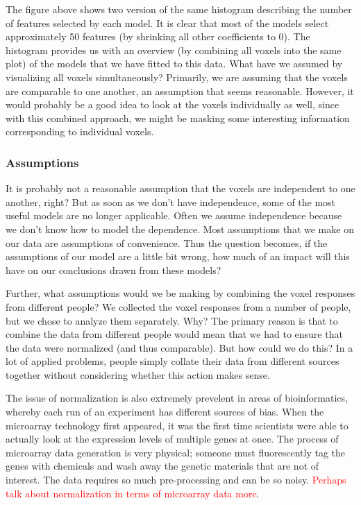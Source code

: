 The figure above shows two version of the same histogram describing the number of features selected by each model. It is clear that most of the models select approximately 50 features (by shrinking all other coefficients to 0). The histogram provides us with an overview (by combining all voxels into the same plot) of the models that we have fitted to this data. What have we assumed by visualizing all voxels simultaneously? Primarily, we are assuming that the voxels are comparable to one another, an assumption that seems reasonable. However, it would probably be a good idea to look at the voxels individually as well, since with this combined approach, we might be masking some interesting information corresponding to individual voxels. 

\subsubsection{Assumptions}

It is probably not a reasonable assumption that the voxels are independent to one another, right? But as soon as we don't have independence, some of the most useful models are no longer applicable. Often we assume independence because we don't know how to model the dependence. Most assumptions that we make on our data are assumptions of convenience. Thus the question becomes, if the assumptions of our model are a little bit wrong, how much of an impact will this have on our conclusions drawn from these models? 


Further, what assumptions would we be making by combining the voxel responses from different people? We collected the voxel responses from a number of people, but we chose to analyze them separately. Why? The primary reason is that to combine the data from different people would mean that we had to ensure that the data were normalized (and thus comparable). But how could we do this? In a lot of applied problems, people simply collate their data from different sources together without considering whether this action makes sense.

The issue of normalization is also extremely prevelent in areas of bioinformatics, whereby each run of an experiment has different sources of bias. When the microarray technology first appeared, it was the first time scientists were able to actually look at the expression levels of multiple genes at once. The process of microarray data generation is very physical; someone must fluorescently tag the genes with chemicals and wash away the genetic materials that are not of interest. The data requires so much pre-processing and can be so noisy. \textcolor{red}{Perhaps talk about normalization in terms of microarray data more}. 

